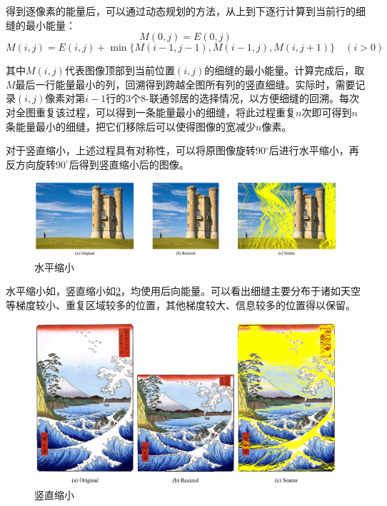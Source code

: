 \documentclass[twoside,a4paper,4pt]{article}
\begin{document}
得到逐像素的能量后，可以通过动态规划的方法，从上到下逐行计算到当前行的细缝的最小能量：
$$
M(0, j) = E(0, j)
$$
$$
M(i,j) = E(i, j) + \min\{ M(i-1,j-1), M(i-1,j), M(i,j+1) \} \quad (i > 0)
$$\par
其中$M(i,j)$代表图像顶部到当前位置$(i,j)$的细缝的最小能量。计算完成后，取$M$最后一行能量最小的列，回溯得到跨越全图所有列的竖直细缝。实际时，需要记录$(i,j)$像素对第$i-1$行的3个8-联通邻居的选择情况，以方便细缝的回溯。每次对全图重复该过程，可以得到一条能量最小的细缝，将此过程重复$n$次即可得到$n$条能量最小的细缝，把它们移除后可以使得图像的宽减少$n$像素。\par
对于竖直缩小，上述过程具有对称性，可以将原图像旋转90$^\circ$后进行水平缩小，再反方向旋转$90^\circ$后得到竖直缩小后的图像。
\begin{figure}[H]
    \centering
    \includegraphics[width=\linewidth]{demo/output/castle.png}
    \vspace{-30pt}\caption{水平缩小}
    \label{fig:narrow_horiz}
\end{figure}\par
水平缩小如，竖直缩小如\cref{fig:narrow_vert}，均使用后向能量。可以看出细缝主要分布于诸如天空等梯度较小、重复区域较多的位置，其他梯度较大、信息较多的位置得以保留。
\begin{figure}[H]
    \centering
    \includegraphics[width=\linewidth]{demo/output/fuji.png}
    \vspace{-30pt}\caption{竖直缩小}
    \label{fig:narrow_vert}
\end{figure}\par
\end{document}
